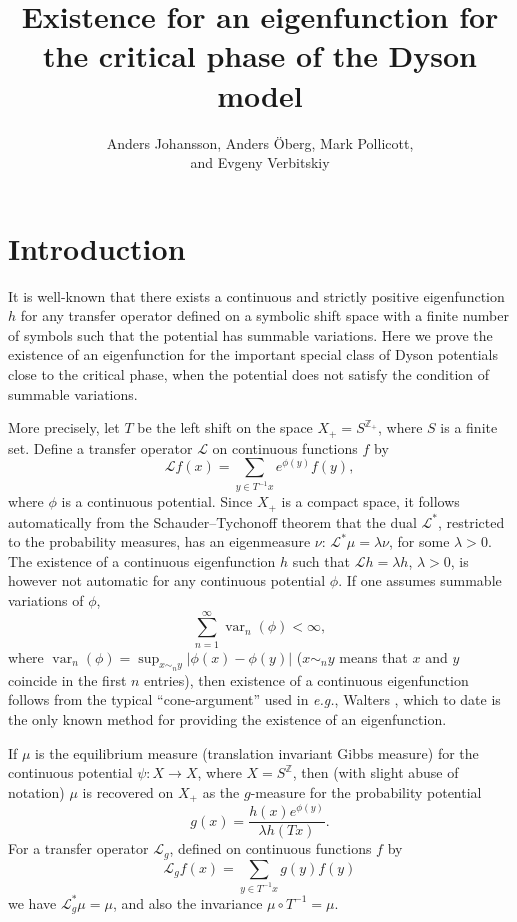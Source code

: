 \documentclass[11pt, a4paper, oneside]{scrartcl}
\title{Existence for an eigenfunction for the critical phase of the Dyson model}
\author{Anders Johansson, Anders \"Oberg, Mark Pollicott, \\ and Evgeny Verbitskiy}
\date{}
\theoremstyle{definition}
\theoremstyle{remark}
\providecommand{\opn}{\operatorname}
\providecommand{\var}{\opn{var}}
\begin{document}
\maketitle

\def\h{h}


\section{Introduction}\noindent

It is well-known that there exists a continuous and strictly positive
eigenfunction $h$ for any transfer operator defined on a symbolic shift space
with a finite number of symbols such that the potential has summable variations.
Here we prove the existence of an eigenfunction for the important special class
of Dyson potentials close to the critical phase, when the potential does not
satisfy the condition of summable variations.

More precisely, let $T$ be the left shift on the space $X_+=S^{{\mathbb Z}_+}$,
where $S$ is a finite set. Define a transfer operator ${\mathcal L}$ on
continuous functions $f$ by
\begin{equation}\label{trans} {\mathcal L} f(x)= \sum_{y\in T^{-1}x}
  e^{\phi(y)}f(y),
\end{equation}
where $\phi$ is a continuous potential. Since $X_+$ is a compact space, it
follows automatically from the Schauder--Tychonoff theorem that the dual
${\mathcal L}^*$, restricted to the probability measures, has an eigenmeasure
$\nu$: ${\mathcal L}^* \mu=\lambda \nu$, for some $\lambda>0$. The existence of
a continuous eigenfunction $h$ such that ${\mathcal L}h=\lambda h$, $\lambda>0$,
is however not automatic for any continuous potential $\phi$. If one assumes
summable variations of $\phi$,
\begin{equation}\label{sum}
  \sum_{n=1}^\infty \var_n (\phi)<\infty,
\end{equation}
where $\var_n(\phi)=\sup_{x\sim_n y}|\phi(x)-\phi(y)|$ ($x\sim_n y$ means that
$x$ and $y$ coincide in the first $n$ entries), then existence of a continuous
eigenfunction follows from the typical ``cone-argument'' used in {\em e.g.},
Walters \cite{waltersConvergenceRuelleOperator2001}, which to date is the only
known method for providing the existence of an eigenfunction.

If $\mu$ is the equilibrium measure (translation invariant Gibbs measure) for
the continuous potential $\psi:X\to X$, where $X=S^{\mathbb Z}$, then (with
slight abuse of notation) $\mu$ is recovered on $X_+$ as the $g$-measure for the
probability potential
\begin{equation}\label{g}
  g(x)= \frac{h(x) e^{\phi(y)}}{\lambda h(Tx)}.
\end{equation} 
For a transfer operator ${\mathcal L}_g$, defined on continuous functions $f$ by
\begin{equation} {\mathcal L}_g f(x)=\sum_{y\in T^{-1}x} g(y) f(y)
\end{equation}
we have ${\mathcal L}_g^*\mu=\mu$, and also the invariance $\mu\circ
T^{-1}=\mu$.
\end{document}
